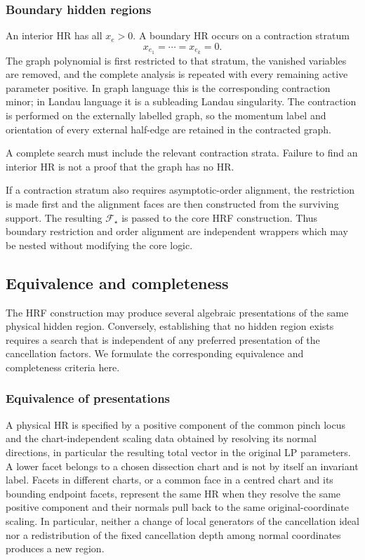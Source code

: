 \documentclass[a4paper,11pt]{article}
\begin{document}
\subsubsection{Boundary hidden regions}
\label{sec:boundary}

An interior HR has all \(x_e>0\).  A boundary HR occurs on a contraction
stratum
\begin{equation}
 x_{e_1}=\cdots=x_{e_k}=0.
\end{equation}
The graph polynomial is first restricted to that stratum, the vanished
variables are removed, and the complete analysis is repeated with every
remaining active parameter positive.  In graph language this is the
corresponding contraction minor; in Landau language it is a subleading
Landau singularity.  The contraction is performed on the externally labelled
graph, so the momentum label and orientation of every external half-edge are
retained in the contracted graph.

A complete search must include the relevant contraction strata.  Failure to
find an interior HR is not a proof that the graph has no HR.

If a contraction stratum also requires asymptotic-order alignment, the
restriction is made first and the alignment faces are then constructed from
the surviving support.  The resulting \(\mathcal F_\star\) is passed to the
core HRF construction.  Thus boundary restriction and order alignment are
independent wrappers which may be nested without modifying the core logic.

\subsection{Equivalence and completeness}
\label{sec:search-certification}

The HRF construction may produce several algebraic presentations of the same
physical hidden region.  Conversely, establishing that no hidden region
exists requires a search that is independent of any preferred presentation
of the cancellation factors.  We formulate the corresponding equivalence
and completeness criteria here.

\subsubsection{Equivalence of presentations}
\label{sec:equivalence}

A physical HR is specified by a positive component of the common pinch locus
and the chart-independent scaling data obtained by resolving its normal
directions, in particular the resulting total vector in the original LP
parameters.  A lower facet belongs to a chosen dissection chart and is not by
itself an invariant label.  Facets in different charts, or a common face in a
centred chart and its bounding endpoint facets, represent the same HR when
they resolve the same positive component and their normals pull back to the
same original-coordinate scaling.  In particular, neither a change of local
generators of the cancellation ideal nor a redistribution of the fixed
cancellation depth among normal coordinates produces a new region.
\end{document}
